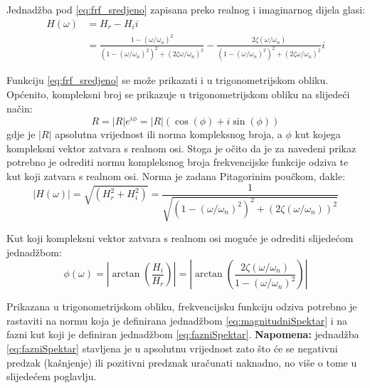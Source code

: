 Jednadžba pod \eqref{eq:frf_sredjeno} zapisana preko realnog i imaginarnog dijela
glasi:
\begin{equation}\label{eq:frf_pravokutni}
    \begin{split}
        H(\omega) &= H_r - H_ii  \\
              &= \frac{1-(\omega/\omega_n)^2}{(1-(\omega/\omega_n)^2)^2+(2\zeta\omega/\omega_n)^2}
              -\frac{2\zeta(\omega/\omega_n)}{(1-(\omega/\omega_n)^2)^2+(2\zeta\omega/\omega_n)^2}i
    \end{split}
\end{equation}

Funkciju \eqref{eq:frf_sredjeno} se može prikazati i u trigonometrijskom obliku.
Općenito, kompleksni broj se prikazuje u trigonometrijskom obliku na slijedeći
način:
\begin{equation}\label{eq:trig_zapis_kompleksni_br}
    R=|R|e^{i\phi} = |R|(\cos(\phi)+i\sin(\phi))
\end{equation}
gdje je $|R|$ apsolutna vrijednost ili norma kompleksnog broja, a $\phi$ kut kojega 
kompleksni vektor zatvara s realnom osi.
Stoga je očito da je za navedeni prikaz potrebno je odrediti normu kompleksnog
broja frekvencijske funkcije odziva te kut koji zatvara s realnom osi. Norma je 
zadana Pitagorinim poučkom, dakle:
\begin{equation}\label{eq:magnitudniSpektar}
    |H(\omega)|=\sqrt{(H_r^2+H_i^2)}
               =\frac{1}{\sqrt{(1-(\omega/\omega_n)^2)^2+(2\zeta(\omega/\omega_n))^2}}
\end{equation}

Kut koji kompleksni vektor zatvara s realnom osi moguće je odrediti slijedećom
jednadžbom:
\begin{equation}\label{eq:fazniSpektar}
    \phi(\omega)= \left|\arctan\left(\frac{H_i}{H_r}\right)\right| 
                = \left|\arctan\left(\frac{2\zeta(\omega/\omega_n)}
                        {1-(\omega/\omega_n)^2}\right)\right|
\end{equation}

Prikazana u trigonometrijskom obliku, frekvencijsku funkciju odziva potrebno je
rastaviti na normu koja je definirana jednadžbom \eqref{eq:magnitudniSpektar} i
na fazni kut koji je definiran jednadžbom \eqref{eq:fazniSpektar}.
\textbf{Napomena:} jednadžba \eqref{eq:fazniSpektar} stavljena je u apsolutnu
vrijednost zato što će se negativni predzak (kašnjenje) ili pozitivni predznak
uračunati naknadno, no više o tome u slijedećem poglavlju.
